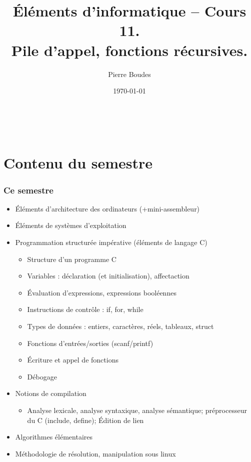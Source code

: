 \documentclass[xcolor=svgnames]{beamer}
\title{Éléments d'informatique -- Cours 11.\\ Pile d'appel, fonctions récursives.}
\author{Pierre Boudes}
\date{\today}
\begin{document}
\begin{frame}
        \titlepage
        \vfill
        \begin{center}
                \\[2.5ex]
                {\tiny\CcNote{\CcLongnameByNcSa}}
                \vspace*{-2.5ex}
        \end{center}
\end{frame}


\section[Plan du cours]{Contenu du semestre}
\begin{frame}
  \frametitle{Ce semestre\nowrite}

  \begin{itemize}
  \item Éléments d'architecture des ordinateurs (+mini-assembleur)
  \item Éléments de systèmes d'exploitation
\item Programmation structurée impérative (éléments de langage C)
\begin{itemize}
  \item Structure d'un programme C
  \item Variables : déclaration (et initialisation), affectaction
  \item Évaluation d'expressions, expressions booléennes
  \item Instructions de contrôle : if, for, while
  \item Types de données : entiers,  caractères,
    réels, tableaux, struct
  \item Fonctions d'entrées/sorties (scanf/printf)
\item Écriture et appel de fonctions
  \item Débogage
\end{itemize}
\item Notions de compilation
  \begin{itemize}
  \item  Analyse lexicale, analyse syntaxique, analyse sémantique;
  préprocesseur du C (include, define);
  Édition de lien
  \end{itemize}
\item Algorithmes élémentaires
\item Méthodologie de résolution, manipulation sous linux
\end{itemize}
 \end{frame}
\end{document}
